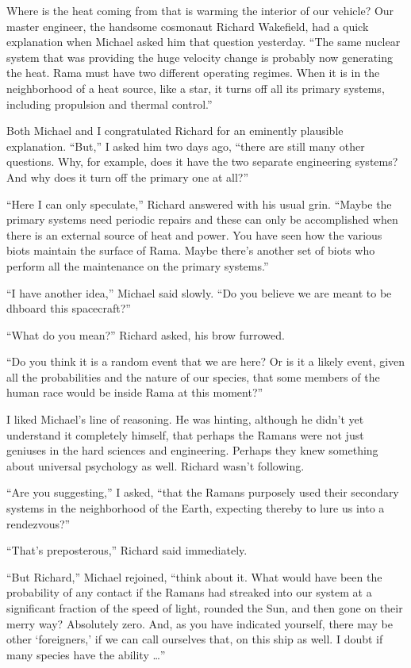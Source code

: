 \documentclass[]{article}
\begin{document}
Where is the heat coming from that is warming the interior of our vehicle? Our master engineer, the handsome cosmonaut Richard Wakefield, had a quick explanation when Michael asked him that question yesterday. “The same nuclear system that was providing the huge velocity change is probably now generating the heat. Rama must have two different operating regimes. When it is in the neighborhood of a heat source, like a star, it turns off all its primary systems, including propulsion and thermal control.”

Both Michael and I congratulated Richard for an eminently plausible explanation. “But,” I asked him two days ago, “there are still many other questions. Why, for example, does it have the two separate engineering systems? And why does it turn off the primary one at all?”

“Here I can only speculate,” Richard answered with his usual grin. “Maybe the primary systems need periodic repairs and these can only be accomplished when there is an external source of heat and power. You have seen how the various biots maintain the surface of Rama. Maybe there’s another set of biots who perform all the maintenance on the primary systems.”

“I have another idea,” Michael said slowly. “Do you believe we are meant to be dhboard this spacecraft?”

“What do you mean?” Richard asked, his brow furrowed.

“Do you think it is a random event that we are here? Or is it a likely event, given all the probabilities and the nature of our species, that some members of the human race would be inside Rama at this moment?”

I liked Michael’s line of reasoning. He was hinting, although he didn’t yet understand it completely himself, that perhaps the Ramans were not just geniuses in the hard sciences and engineering. Perhaps they knew something about universal psychology as well. Richard wasn’t following.

“Are you suggesting,” I asked, “that the Ramans purposely used their secondary systems in the neighborhood of the Earth, expecting thereby to lure us into a rendezvous?”

“That’s preposterous,” Richard said immediately.

“But Richard,” Michael rejoined, “think about it. What would have been the probability of any contact if the Ramans had streaked into our system at a significant fraction of the speed of light, rounded the Sun, and then gone on their merry way? Absolutely zero. And, as you have indicated yourself, there may be other ‘foreigners,’ if we can call ourselves that, on this ship as well. I doubt if many species have the ability …”
\end{document}
